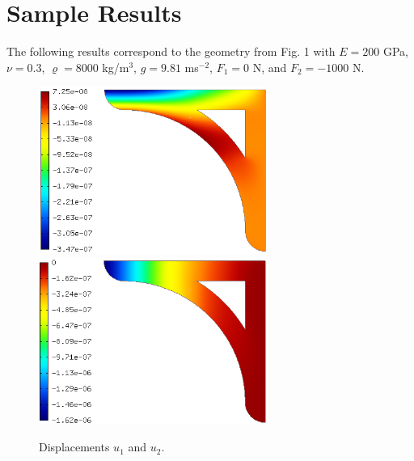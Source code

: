 \documentclass{article}
\begin{document}
\section{Sample Results}

The following results correspond to the geometry from Fig. 1 with 
$E = 200$ GPa, $\nu = 0.3$, $\varrho = 8000$ kg/m$^3$,
$g = 9.81$ ms$^{-2}$, $F_1 = 0$ N, and $F_2 = -1000$ N.

\begin{figure}[!ht]
\begin{center}
\includegraphics[width=7.5cm]{img/result-1.png}\ \ \ \ \ \ 
\includegraphics[width=7.5cm]{img/result-2.png}
\caption{Displacements $u_1$ and $u_2$.}
\vspace{4mm}
\end{center}
\end{figure}
\end{document}
